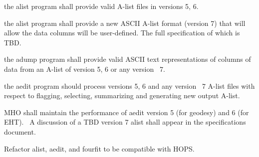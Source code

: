 \begin{description}

 the \acs{alist} program shall provide valid \acs{A-list}
    files in versions 5, 6. 

 the \acs{alist} program shall provide a new ASCII
 A-list format (version 7) that will allow the data columns will be user-defined.
 The full specification of which is TBD.

 the \acs{adump} program shall provide valid ASCII text
    representations of columns of data from an \acs{A-list} of version
    5, 6 or any version \TBD~7.

 the \acs{aedit} program should process versions 5, 6 and
    any version \TBD~7 \acs{A-list} files with respect to flagging,
    selecting, summarizing and generating new output \acs{A-list}.


 \ac{MHO} shall maintain the performance of \acs{aedit} version
5 (for geodesy) and 6 (for EHT). \TBD~A discussion of a TBD
version 7 alist shall appear in the specifications document.

%
%
%
%

 Refactor alist, aedit, and fourfit to be compatible with \ac{HOPS}.


%

\end{description}


